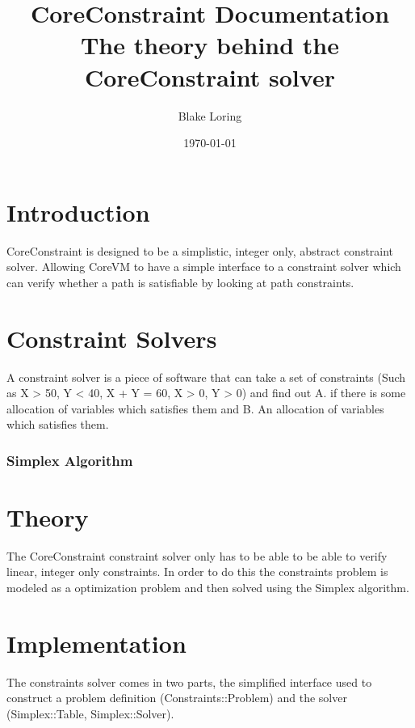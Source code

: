 \documentclass{report}
\begin{document}
\title{CoreConstraint Documentation \\ \large The theory behind the CoreConstraint solver}
\author{Blake Loring}
\date{\today}

\maketitle

\chapter {Introduction}

CoreConstraint is designed to be a simplistic, integer only, abstract constraint solver. Allowing CoreVM to have a simple interface to a constraint solver which can verify whether a path is satisfiable by looking at path constraints.

\chapter {Constraint Solvers}

A constraint solver is a piece of software that can take a set of constraints (Such as X > 50, Y < 40, X + Y = 60, X > 0, Y > 0) and find out A. if there is some allocation of variables which satisfies them and B. An allocation of variables which satisfies them.

\subsection {Simplex Algorithm}

\chapter {Theory}

The CoreConstraint constraint solver only has to be able to be able to verify linear, integer only constraints. In order to do this the constraints problem is modeled as a optimization problem and then solved using the Simplex algorithm.

\chapter {Implementation}

The constraints solver comes in two parts, the simplified interface used to construct a problem definition (Constraints::Problem) and the solver (Simplex::Table, Simplex::Solver).
\end{document}

